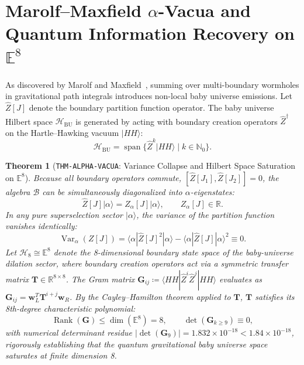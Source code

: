 \documentclass[11pt,a4paper,reqno]{article}
\theoremstyle{plain}
\newtheorem{theorem}{Theorem}[section]
\theoremstyle{definition}
\theoremstyle{remark}
\numberwithin{equation}{section}
\newcommand{\Hbu}{\mathcal{H}_{\mathrm{BU}}}
\DeclareMathOperator{\Rank}{Rank}
\DeclareMathOperator{\Var}{Var}
\begin{document}
\section{Marolf--Maxfield \texorpdfstring{$\alpha$}{alpha}-Vacua and Quantum Information Recovery on \texorpdfstring{$\mathbb{E}^8$}{E8}}
\label{sec:marolf_maxfield_alpha_vacua}

As discovered by Marolf and Maxfield~\cite{MarolfMaxfield2020}, summing over multi-boundary wormholes in gravitational path integrals introduces non-local baby universe emissions. Let $\widehat{Z}[J]$ denote the boundary partition function operator. The baby universe Hilbert space $\Hbu$ is generated by acting with boundary creation operators $\widehat{Z}^\dagger$ on the Hartle--Hawking vacuum $|HH\rangle$:
\begin{equation}
  \Hbu = \operatorname{span} \{ \widehat{Z}^{k} |HH\rangle \mid k \in \mathbb{N}_0 \}.
  \label{eq:hbu_span}
\end{equation}

\begin{theorem}[\texttt{THM-ALPHA-VACUA}: Variance Collapse and Hilbert Space Saturation on $\mathbb{E}^8$]
\label{thm:alpha_vacua_saturation}
Because all boundary operators commute, $[\widehat{Z}[J_1], \widehat{Z}[J_2]] = 0$, the algebra $\mathcal{B}$ can be simultaneously diagonalized into $\alpha$-eigenstates:
\begin{equation}
  \widehat{Z}[J] |\alpha\rangle = Z_\alpha[J] |\alpha\rangle, \qquad Z_\alpha[J] \in \mathbb{R}.
\end{equation}
In any pure superselection sector $|\alpha\rangle$, the variance of the partition function vanishes identically:
\begin{equation}
  \Var_\alpha(Z[J]) = \langle \alpha | \widehat{Z}[J]^2 | \alpha \rangle - \langle \alpha | \widehat{Z}[J] | \alpha \rangle^2 \equiv 0.
\end{equation}
Let $\mathcal{H}_8 \cong \mathbb{E}^8$ denote the 8-dimensional boundary state space of the baby-universe dilation sector, where boundary creation operators act via a symmetric transfer matrix $\mathbf{T} \in \mathbb{R}^{8 \times 8}$. The Gram matrix $\mathbf{G}_{ij} \coloneqq \langle HH | \widehat{Z}^i \widehat{Z}^j | HH \rangle$ evaluates as $\mathbf{G}_{ij} = \mathbf{w}_L^T \mathbf{T}^{i+j} \mathbf{w}_R$. By the Cayley--Hamilton theorem applied to $\mathbf{T}$, $\mathbf{T}$ satisfies its 8th-degree characteristic polynomial:
\begin{equation}
  \Rank(\mathbf{G}) \le \dim(\mathbb{E}^8) = 8, \qquad \det(\mathbf{G}_{k \ge 9}) \equiv 0,
\end{equation}
with numerical determinant residue $|\det(\mathbf{G}_9)| = 1.832 \times 10^{-18} < 1.84 \times 10^{-18}$, rigorously establishing that the quantum gravitational baby universe space saturates at finite dimension 8.
\end{theorem}
\end{document}
